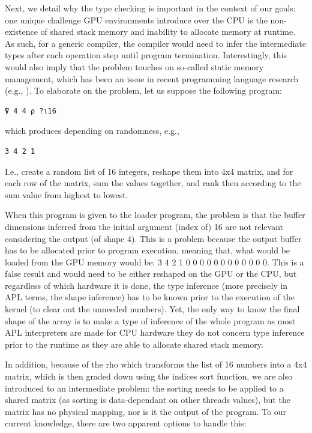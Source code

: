 \documentclass{IEEEtran}
\begin{document}
Next, we detail why the type checking is important in the context of our goals: one unique challenge GPU environments introduce over the CPU is the non-existence of shared stack memory and inability to allocate memory at runtime. As such, for a generic compiler, the compiler would need to infer the intermediate types after each operation step until program termination. Interestingly, this would also imply that the problem touches on so-called static memory management, which has been an issue in recent programming language research (e.g., \cite{proust2017asap}). To elaborate on the problem, let us suppose the following program:

{\aplfont\begin{verbatim}
⍒ 4 4 ⍴ ?⍳16
\end{verbatim}}

which produces depending on randomness, e.g.,

{\aplfont\begin{verbatim}
3 4 2 1
\end{verbatim}}

I.e., create a random list of 16 integers, reshape them into 4x4 matrix, and for each row of the matrix, sum the values together, and rank then according to the sum value from highest to lowest.

When this program is given to the loader program, the problem is that the buffer dimensions inferred from the initial argument (index of) 16 are not relevant considering the output (of shape 4). This is a problem because the output buffer has to be allocated prior to program execution, meaning that, what would be loaded from the GPU memory would be: 3 4 2 1 0 0 0 0 0 0 0 0 0 0 0 0. This is a false result and would need to be either reshaped on the GPU or the CPU, but regardless of which hardware it is done, the type inference (more precisely in APL terms, the shape inference) has to be known prior to the execution of the kernel (to clear out the unneeded numbers). Yet, the only way to know the final shape of the array is to make a type of inference of the whole program as most APL interpreters are made for CPU hardware they do not concern type inference prior to the runtime as they are able to allocate shared stack memory.

In addition, because of the rho which transforms the list of 16 numbers into a 4x4 matrix, which is then graded down using the indices sort function, we are also introduced to an intermediate problem: the sorting needs to be applied to a shared matrix (as sorting is data-dependant on other threads values), but the matrix has no physical mapping, nor is it the output of the program. To our current knowledge, there are two apparent options to handle this:
\end{document}
